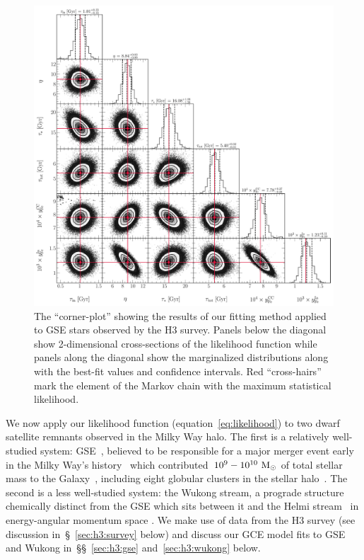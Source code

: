 \documentclass[ms.tex]{subfiles}
\begin{document}
\begin{figure}
\centering
\includegraphics[scale = 0.5]{gsechem_512k.pdf}
\caption{
The ``corner-plot'' showing the results of our fitting method applied to GSE
stars observed by the H3 survey.
Panels below the diagonal show 2-dimensional cross-sections of the likelihood
function while panels along the diagonal show the marginalized distributions
along with the best-fit values and confidence intervals.
Red ``cross-hairs'' mark the element of the Markov chain with the maximum
statistical likelihood.
}
\label{fig:gse_corner}
\end{figure}

We now apply our likelihood function (equation~\ref{eq:likelihood}) to two
dwarf satellite remnants observed in the Milky Way halo.
The first is a relatively well-studied system: GSE~\citep{Belokurov2018,
Helmi2018}, believed to be responsible for a major merger event early in the
Milky Way's history~\citep{Chaplin2020} which contributed~$10^9 - 10^{10}~\text{M}_\odot$
of total stellar mass to the Galaxy~\citep{Deason2019, Fattahi2019,
Mackereth2019, Vincenzo2019}, including eight globular clusters in the stellar
halo~\citep{Myeong2018}.
The second is a less well-studied system: the Wukong stream, a prograde
structure chemically distinct from the GSE which sits between it and the
Helmi stream~\citep{Helmi1999} in energy-angular momentum space
\citep{Naidu2020, Naidu2022}.
We make use of data from the H3 survey (see discussion
in~\S~\ref{sec:h3:survey} below) and discuss our GCE model fits to GSE and
Wukong in~\S\S~\ref{sec:h3:gse} and~\ref{sec:h3:wukong} below.
\end{document}

